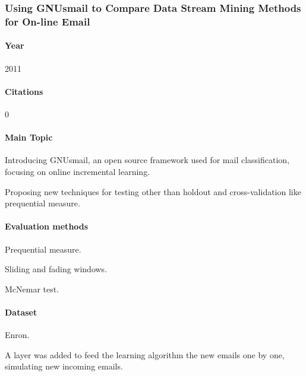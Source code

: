 \documentclass[12pt]{article}
\newenvironment{my_itemize}
{\begin{itemize}
  \setlength{\itemsep}{0cm}
  \setlength{\parskip}{0cm}}
{\end{itemize}}
\begin{document}

\subsubsection{Using GNUsmail to Compare Data Stream Mining Methods for On-line Email \cite{JOSE11}}
\paragraph{Year} 2011

\paragraph{Citations} 0

\paragraph{Main Topic}
\begin{my_itemize}
    \item Introducing GNUsmail, an open source framework used for mail 
	  classification, focusing on online incremental learning.
    \item Proposing new techniques for testing other than holdout and 
	  cross-validation like prequential measure.
\end{my_itemize}

\paragraph{Evaluation methods}
\begin{my_itemize}
    \item Prequential measure.
    \item Sliding and fading windows.
    \item McNemar test.
\end{my_itemize}

\paragraph{Dataset}
\begin{my_itemize}
    \item Enron.
    \item A layer was added to feed the learning algorithm the new emails one 
	  by one, simulating new incoming emails.
\end{my_itemize}
\end{document}
